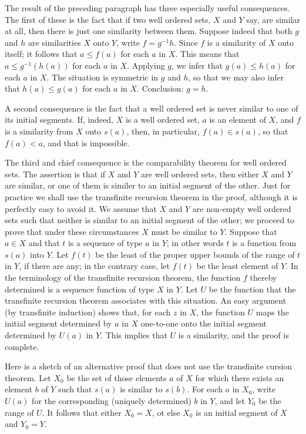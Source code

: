 The result of the preceding paragraph has three especially useful consequences. The first of these is the fact that if two well ordered sets, $X$ and $Y$ say, are similar at all, then there is just one similarity between them. Suppose indeed that both $g$ and $h$ are similarities $X$ onto $Y$, write $f = g^{-1}h$. Since $f$ is a similarity of $X$ onto itself; it follows that $a \le f(a)$ for each $a$ in $X$. This means that $a \le g^{-1}(h(a))$ for each $a$ in $X$. Applying $g$, we infer that $g(a) \le h(a)$ for each $a$ in $X$. The situation is symmetric in $g$ and $h$, so that we may also infer that $h(a) \le g(a)$ for each $a$ in $X$. Conclusion: $g = h$. 

A second consequence is the fact that a well ordered set is never similar to one of its initial segments. If, indeed, $X$ is a well ordered set, $a$ is an element of $X$, and $f$ is a similarity from $X$ onto $s(a)$, then, in particular, $f(a) \in s(a)$, so that $f(a) < a$, and that is impossible. 

The third and chief consequence is the comparability theorem for well ordered sets. The assertion is that if $X$ and $Y$ are well ordered sets, then either $X$ and $Y$ are similar, or one of them is similer to an initial segment of the other. Just for practice we shall use the transfinite recursion theorem in the proof, although it is perfectly easy to avoid it. We assume that $X$ and $Y$ are non-empty well ordered sets such that neither is similar to an initial segment of the other; we proceed to prove that under these circumstances $X$ must be similar to $Y$. Suppose that $a \in X$ and that $t$ is a sequence of type $a$ in $Y$; in other words $t$ is a function from $s(a)$ into $Y$. Let $f(t)$ be the least of the proper upper bounds of the range of $t$ in $Y$, if there are any; in the contrary case, let $f(t)$ be the least element of $Y$. In the terminology of the transfinite recursion theorem, the function $f$ thereby determined is a sequence function of type $X$ in $Y$. Let $U$ be the function that the transfinite recursion theorem associates with this situation. An easy argument (by transfinite induction) shows that, for each $z$ in $X$, the function $U$ maps the initial segment determined by $a$ in $X$ one-to-one onto the initial segment determined by $U(a)$ in $Y$. This implies that $U$ is a similarity, and the proof is complete. 

Here is a sketch of an alternative proof that does not use the transfinite cursion theorem. Let $X_{0}$ be the set of those elements $a$ of $X$ for which there exists an element $b$ of $Y$ such that $s(a)$ is similar to $s(b)$. For each $a$ in $X_{0}$, write $U(a)$ for the corresponding (uniquely determined) $b$ in $Y$, and let $Y_{0}$ be the range of $U$. It follows that either $X_{0} = X$, ot else $X_{0}$ is an initial segment of $X$ and $Y_{0} = Y$. 

